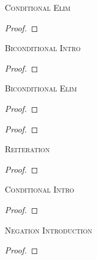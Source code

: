 \begin{multicols}{2}
\newpage %

\noindent\textsc{Conditional Elim}

\begin{proof}
	 
\end{proof}
\bigskip


\noindent\textsc{Biconditional Intro}

\begin{proof}
	\end{proof}
\bigskip


\noindent\textsc{Biconditional Elim}

\begin{proof}
	 
\end{proof}

\begin{proof}
	 
\end{proof}
\bigskip


\noindent\textsc{Reiteration}

\begin{proof}
	 
\end{proof}
\bigskip





\vfill\null
\columnbreak


\noindent\textsc{Conditional Intro}

\nopagebreak
\begin{proof}
	\open
		 \as{}
	\close
	 
\end{proof}
\bigskip



\noindent\textsc{Negation Introduction}

\begin{proof}
	\open
		 \as{}
	\close
	 
\end{proof}
\bigskip



\end{multicols}
